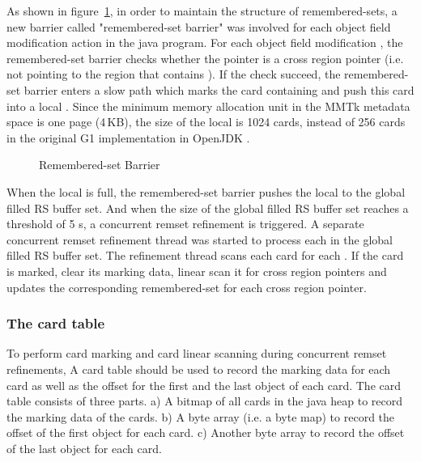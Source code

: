 As shown in figure~\ref{fig:remsetbarrier}, in order to maintain the structure of remembered-sets,
a new barrier called "remembered-set barrier" was involved for each object field modification action in the java program.
For each object field modification , the remembered-set barrier checks
whether the pointer  is a cross region pointer (i.e. not pointing to the region that contains ).
If the check succeed, the remembered-set barrier enters a slow path which marks the
card containing  and push this card into a local .
Since the minimum memory allocation unit in the MMTk metadata space is one page (4\,KB), the size of
the local  is 1024 cards, instead of 256 cards in the original G1 implementation in OpenJDK \cite{detlefs2004garbage}.

\begin{figure}
  \centering
  
  \caption{Remembered-set Barrier}
  \label{fig:remsetbarrier}
\end{figure}

When the local  is full, the remembered-set barrier
pushes the local  to the global filled RS buffer set.
And when the size of the global filled RS buffer set reaches a threshold of 5 s,
a concurrent remset refinement is triggered.
A separate concurrent remset refinement thread was started to process each
 in the global filled RS buffer set.
The refinement thread scans each card for each .
If the card is marked, clear its marking data, linear scan it for cross region pointers
and updates the corresponding remembered-set for each cross region pointer.

\subsubsection{The card table}

To perform card marking and card linear scanning during concurrent remset refinements,
A card table should be used to record the marking data for each card as well as the offset
for the first and the last object of each card.
The card table consists of three parts. a) A bitmap of all cards in the java heap
to record the marking data of the cards. b) A byte array (i.e. a byte map) to record the
offset of the first object for each card. c) Another byte array to record the
offset of the last object for each card.

